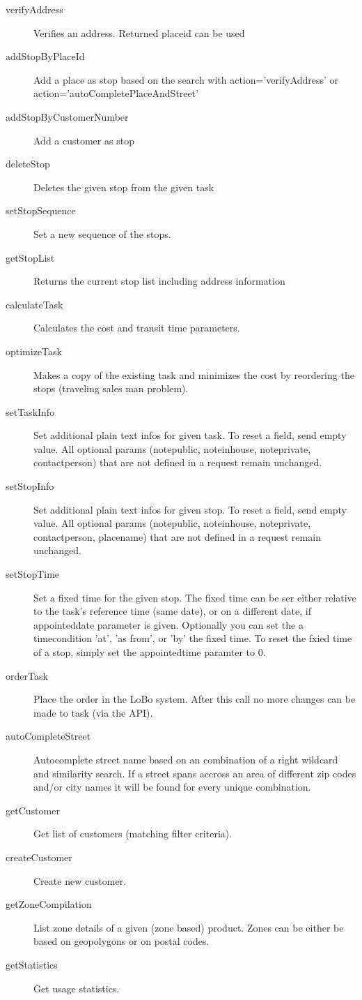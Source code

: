 \begin{description}
  \item[verifyAddress] Verifies an address. Returned placeid can be used
  \item[addStopByPlaceId] Add a place as stop based on the search with action='verifyAddress' or action='autoCompletePlaceAndStreet'
  \item[addStopByCustomerNumber] Add a customer as stop
  \item[deleteStop] Deletes the given stop from the given task
  \item[setStopSequence] Set a new sequence of the stops.
  \item[getStopList] Returns the current stop list including address information
  \item[calculateTask] Calculates the cost and transit time parameters.
  \item[optimizeTask] Makes a copy of the existing task and minimizes the cost by reordering the stops (traveling sales man problem).
  \item[setTaskInfo] Set additional plain text infos for given task. To reset a field, send empty value. All optional params (notepublic, noteinhouse, noteprivate, contactperson) that are not defined in a request remain unchanged.
  \item[setStopInfo] Set additional plain text infos for given stop. To reset a field, send empty value. All optional params (notepublic, noteinhouse, noteprivate, contactperson, placename) that are not defined in a request remain unchanged.
  \item[setStopTime] Set a fixed time for the given stop. The fixed time can be ser either relative to the task's reference time (same date), or on a different date, if appointeddate parameter is given. Optionally you can set the a timecondition 'at', 'as from', or 'by' the fixed time. To reset the fxied time of a stop, simply set the appointedtime paramter to 0.
  \item[orderTask] Place the order in the LoBo system. After this call no more changes can be made to task (via the API).
  \item[autoCompleteStreet] Autocomplete street name based on an combination of a right wildcard and similarity search. If a street spans accross an area of different zip codes and/or city names it will be found for every unique combination.
  \item[getCustomer] Get list of customers (matching filter criteria).
  \item[createCustomer] Create new customer.
  \item[getZoneCompilation] List zone details of a given (zone based) product. Zones can be either be based on geopolygons or on postal codes.
  \item[getStatistics] Get usage statistics.
\end{description}

